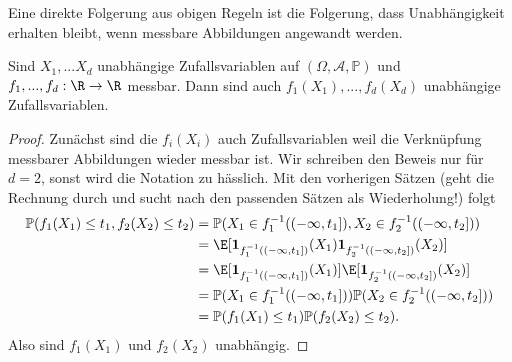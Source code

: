 Eine direkte Folgerung aus obigen Regeln ist die Folgerung, dass Unabh\"angigkeit erhalten bleibt, wenn messbare Abbildungen angewandt werden.
\begin{korollar}\label{ku}
	Sind $X_1,...X_d$ unabh\"angige Zufallsvariablen auf $(\Omega, \mathcal A, \mathbb P)$ und $f_1,...,f_d:\R\to \R$ messbar. Dann sind auch $f_1(X_1),...,f_d(X_d)$ unabh\"angige Zufallsvariablen.
\end{korollar}
\begin{proof}
	Zun\"achst sind die $f_i(X_i)$ auch Zufallsvariablen weil die Verkn\"upfung messbarer Abbildungen wieder messbar ist.	Wir schreiben den Beweis nur f\"ur $d=2$, sonst wird die Notation zu h\"asslich. Mit den vorherigen S\"atzen (geht die Rechnung durch und sucht nach den passenden S\"atzen als Wiederholung!) folgt
	\begin{align*}
		\mathbb P(f_1(X_1)\leq t_1, f_2(X_2)\leq t_2)&=\mathbb P(X_1\in f^{-1}_1((-\infty, t_1]), X_2\in f_2^{-1}((-\infty,t_2]))\\
		&=\E[\mathbf 1_{f_1^{-1}((-\infty,t_1])}(X_1) \mathbf 1_{f_2^{-1}((-\infty,t_2])}(X_2)]\\
		&=\E[\mathbf 1_{f_1^{-1}((-\infty,t_1])}(X_1)]\E[ \mathbf 1_{f_2^{-1}((-\infty,t_2])}(X_2)]\\
		&=\mathbb P(X_1\in f^{-1}_1((-\infty, t_1]))\mathbb P( X_2\in f_2^{-1}((-\infty,t_2]))\\
		&=\mathbb P(f_1(X_1)\leq t_1) \mathbb P( f_2(X_2)\leq t_2).
	\end{align*}
	Also sind $f_1(X_1)$ und $f_2(X_2)$ unabh\"angig.
\end{proof}

